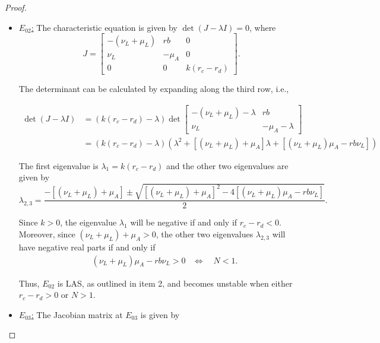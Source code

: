 \documentclass{article}
\theoremstyle{remark}
\theoremstyle{custom} %
\begin{document}
\begin{proof}
\begin{itemize}
Hence, \( E_{01} \) is LAS, which establishes the stability condition stated in item 1. On the other hand, \( E_{01} \) becomes unstable if at least one eigenvalue is positive, which occurs when \( r_d - r_c > 0 \), or when \( N > 1 \).



  \item \underline{$E_{02}$:} The 
characteristic equation is given by \(\det(J - \lambda I) = 0\), where
$$J = \begin{bmatrix}
-(\nu_L + \mu_L) & r b & 0 \\
\nu_L & -\mu_A & 0 \\
0 & 0 & k(r_c - r_d)
\end{bmatrix}.$$

The determinant can be calculated by expanding along the third row, i.e.,


$\begin{aligned} \operatorname{det}(J-\lambda I) & =\left(k\left(r_c-r_d\right)-\lambda\right) \operatorname{det}\left[\begin{array}{cc}-\left(\nu_L+\mu_L\right)-\lambda & r b \\ \nu_L & -\mu_A-\lambda\end{array}\right] \\ & =\left(k\left(r_c-r_d\right)-\lambda\right)\left(\lambda^2+\left[\left(\nu_L+\mu_L\right)+\mu_A\right] \lambda+\left[\left(\nu_L+\mu_L\right) \mu_A-r b \nu_L\right]\right)\end{aligned}$

The first eigenvalue is \(\lambda_1 = k(r_c - r_d)\) and the other two eigenvalues are given by 
$$\lambda_{2,3} = \frac{-\left[(\nu_L + \mu_L) + \mu_A\right] \pm \sqrt{\left[(\nu_L + \mu_L) + \mu_A\right]^2 - 4\left[(\nu_L + \mu_L) \mu_A - r b \nu_L\right]}}{2}.$$

Since $k>0$, the eigenvalue \(\lambda_1\) will be negative if and only if $r_c - r_d<0$. Moreover, since  $(\nu_L + \mu_L) + \mu_A > 0 $,  the other two eigenvalues \(\lambda_{2,3}\) will have negative real parts if and only if
$$
\begin{aligned}
& \left(\nu_L+\mu_L\right) \mu_A-r b \nu_L>0 
& \Leftrightarrow\quad {N}<1.
\end{aligned}
$$

Thus, $E_{02}$ is LAS, as outlined in item 2, and becomes unstable when either $r_c-r_d>0$ or $N>1$.



 \item \underline{$E_{03}$:}  The Jacobian matrix at $E_{03}$ is given by


\end{itemize}
\end{proof}
\end{document}

